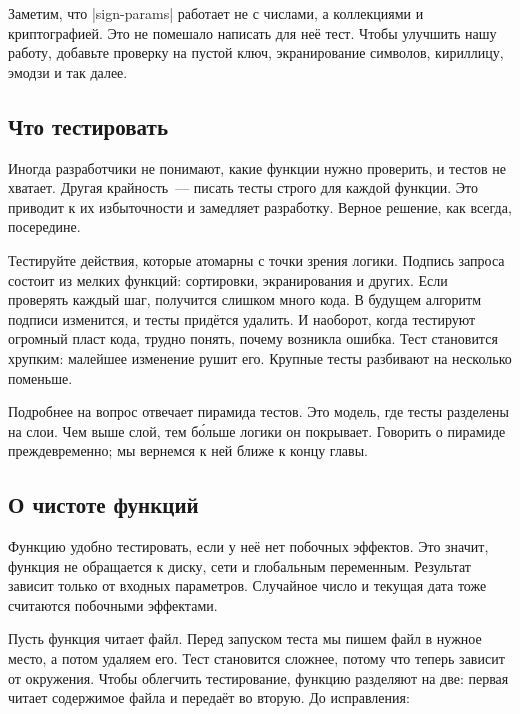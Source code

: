 Заметим, что \spverb|sign-params| работает не с числами, а коллекциями и
криптографией. Это не помешало написать для неё тест. Чтобы улучшить нашу
работу, добавьте проверку на пустой ключ, экранирование символов, кириллицу,
эмодзи и так далее.

\subsection{Что тестировать}

Иногда разработчики не понимают, какие функции нужно проверить, и тестов не
хватает. Другая крайность~--- писать тесты строго для каждой функции. Это
приводит к их избыточности и замедляет разработку. Верное решение, как всегда,
посередине.

Тестируйте действия, которые атомарны с точки зрения логики. Подпись запроса
состоит из мелких функций: сортировки, экранирования и других. Если проверять
каждый шаг, получится слишком много кода. В будущем алгоритм подписи изменится,
и тесты придётся удалить. И наоборот, когда тестируют огромный пласт кода,
трудно понять, почему возникла ошибка. Тест становится хрупким: малейшее
изменение рушит его. Крупные тесты разбивают на несколько поменьше.


Подробнее на вопрос отвечает пирамида тестов.
Это модель, где тесты разделены на слои. Чем выше слой, тем б\'{о}льше логики он
покрывает. Говорить о пирамиде преждевременно; мы вернемся к ней ближе к концу
главы.

\subsection{О чистоте функций}


Функцию удобно тестировать, если у неё нет побочных эффектов. Это значит,
функция не обращается к диску, сети и глобальным переменным. Результат зависит
только от входных параметров. Случайное число и текущая дата тоже считаются
побочными эффектами.

Пусть функция читает файл. Перед запуском теста мы пишем файл в нужное место, а
потом удаляем его. Тест становится сложнее, потому что теперь зависит от
окружения. Чтобы облегчить тестирование, функцию разделяют на две: первая читает
содержимое файла и передаёт во вторую. До исправления:

